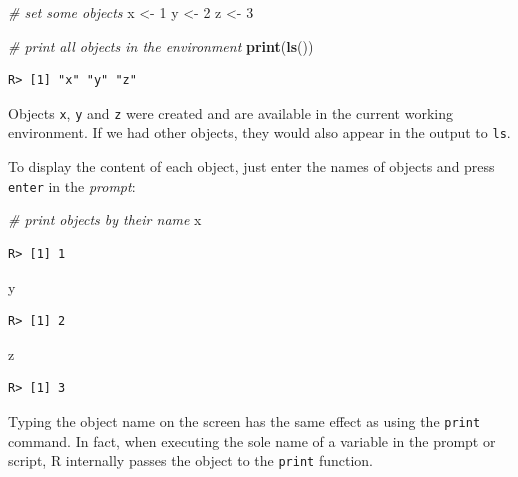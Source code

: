 \documentclass[
  12pt,
]{book}
\newenvironment{Shaded}{\begin{snugshade}}{\end{snugshade}}
\newcommand{\CommentTok}[1]{\textcolor[rgb]{0.37,0.37,0.37}{\textit{#1}}}
\newcommand{\DecValTok}[1]{\textcolor[rgb]{0.06,0.06,0.06}{#1}}
\newcommand{\KeywordTok}[1]{\textcolor[rgb]{0.27,0.27,0.27}{\textbf{#1}}}
\newcommand{\NormalTok}[1]{#1}
\newcommand{\StringTok}[1]{\textcolor[rgb]{0.5,0.5,0.5}{#1}}
\begin{document}
\begin{Shaded}
\begin{Highlighting}[]
\CommentTok{# set some objects}
\NormalTok{x <-}\StringTok{ }\DecValTok{1}
\NormalTok{y <-}\StringTok{ }\DecValTok{2}
\NormalTok{z <-}\StringTok{ }\DecValTok{3}

\CommentTok{# print all objects in the environment}
\KeywordTok{print}\NormalTok{(}\KeywordTok{ls}\NormalTok{())}
\end{Highlighting}
\end{Shaded}

\begin{verbatim}
R> [1] "x" "y" "z"
\end{verbatim}

Objects \texttt{x}, \texttt{y} and \texttt{z} were created and are available in the current working environment. If we had other objects, they would also appear in the output to \texttt{ls}.

To display the content of each object, just enter the names of objects and press \texttt{enter} in the \emph{prompt}:

\begin{Shaded}
\begin{Highlighting}[]
\CommentTok{# print objects by their name}
\NormalTok{x}
\end{Highlighting}
\end{Shaded}

\begin{verbatim}
R> [1] 1
\end{verbatim}

\begin{Shaded}
\begin{Highlighting}[]
\NormalTok{y}
\end{Highlighting}
\end{Shaded}

\begin{verbatim}
R> [1] 2
\end{verbatim}

\begin{Shaded}
\begin{Highlighting}[]
\NormalTok{z}
\end{Highlighting}
\end{Shaded}

\begin{verbatim}
R> [1] 3
\end{verbatim}

Typing the object name on the screen has the same effect as using the \texttt{print} command. In fact, when executing the sole name of a variable in the prompt or script, R internally passes the object to the \texttt{print} function.
\end{document}
